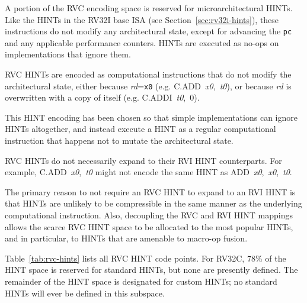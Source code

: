 A portion of the RVC encoding space is reserved for microarchitectural HINTs.
Like the HINTs in the RV32I base ISA (see Section~\ref{sec:rv32i-hints}),
these instructions do not modify any architectural state, except for advancing
the {\tt pc} and any applicable performance counters.  HINTs are
executed as no-ops on implementations that ignore them.

RVC HINTs are encoded as computational instructions that do not modify the
architectural state, either because {\em rd}={\tt x0}
(e.g. \mbox{C.ADD {\em x0}, {\em t0}}), or because {\em rd} is overwritten
with a copy of itself (e.g. \mbox{C.ADDI {\em t0}, 0}).

\begin{commentary}
This HINT encoding has been chosen so that simple implementations can ignore
HINTs altogether, and instead execute a HINT as a regular computational
instruction that happens not to mutate the architectural state.
\end{commentary}

RVC HINTs do not necessarily expand to their RVI HINT counterparts.  For
example, \mbox{C.ADD {\em x0}, {\em t0}} might not encode the same HINT
as \mbox{ADD {\em x0}, {\em x0}, {\em t0}}.

\begin{commentary}
The primary reason to not require an RVC HINT to expand to an RVI HINT
is that HINTs are unlikely to be compressible in the same manner as
the underlying computational instruction.  Also, decoupling the RVC
and RVI HINT mappings allows the scarce RVC HINT space to be allocated
to the most popular HINTs, and in particular, to HINTs that are
amenable to macro-op fusion.
\end{commentary}

Table~\ref{tab:rvc-hints} lists all RVC HINT code points.  For RV32C, 78\% of
the HINT space is reserved for standard HINTs, but none are presently defined.
The remainder of the HINT space is designated for custom HINTs; no standard
HINTs will ever be defined in this subspace.

